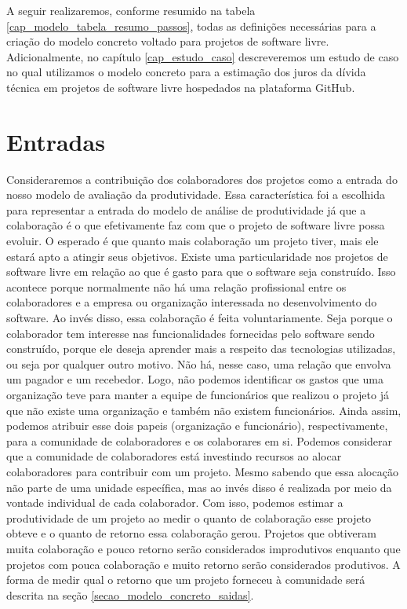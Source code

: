  A seguir realizaremos, conforme resumido na tabela \ref{cap_modelo_tabela_resumo_passos}, todas as definições necessárias para a criação do modelo concreto voltado para projetos de software livre. Adicionalmente, no capítulo \ref{cap_estudo_caso} descreveremos um estudo de caso no qual utilizamos o modelo concreto para a estimação dos juros da dívida técnica em projetos de software livre hospedados na plataforma GitHub.




\section{Entradas}

Consideraremos a contribuição dos colaboradores dos projetos como a entrada do nosso modelo de avaliação da produtividade. Essa característica foi a escolhida para representar a entrada do modelo de análise de produtividade já que a colaboração é o que efetivamente faz com que  o projeto de software livre possa evoluir. O esperado é que quanto mais colaboração um projeto tiver, mais ele estará apto a atingir seus objetivos. Existe uma particularidade nos projetos de software livre em relação ao que é gasto  para que o software seja construído. Isso acontece porque normalmente não há uma relação profissional entre os colaboradores e a empresa ou organização interessada no desenvolvimento do software. Ao invés disso, essa colaboração é feita voluntariamente. Seja porque o colaborador tem interesse nas funcionalidades fornecidas pelo software sendo construído, porque ele deseja aprender mais a respeito das tecnologias utilizadas, ou seja por qualquer outro motivo. Não há, nesse caso, uma relação que envolva um pagador e um recebedor. Logo, não podemos identificar os gastos que uma organização teve para manter a equipe de funcionários que realizou o projeto já que não existe uma organização e também não existem funcionários. Ainda assim, podemos atribuir esse dois papeis (organização e funcionário), respectivamente,  para a comunidade de colaboradores e os colaborares em si. Podemos considerar que a comunidade de colaboradores está investindo recursos ao alocar colaboradores para contribuir com um projeto. Mesmo sabendo que essa alocação não parte de uma unidade específica, mas ao invés disso é realizada por meio da vontade individual de cada colaborador. Com isso, podemos estimar a produtividade de um projeto ao medir o quanto de colaboração esse projeto obteve e o quanto de retorno essa colaboração gerou. Projetos que obtiveram muita colaboração e pouco retorno serão considerados improdutivos enquanto que projetos com pouca colaboração e muito retorno serão considerados produtivos. A forma de medir qual o retorno que um projeto forneceu à comunidade será descrita na seção \ref{secao_modelo_concreto_saidas}.


